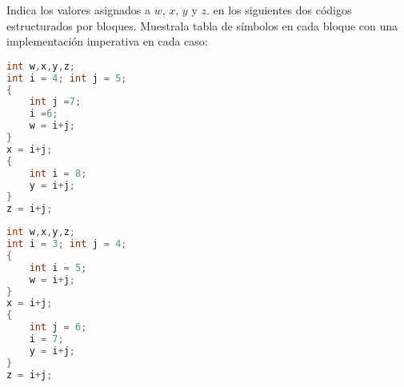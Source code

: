 \begin{Pro}
Indica los valores asignados a $w$, $x$, $y$ y $z$. en los siguientes dos códigos estructurados por bloques.
Muestrala tabla de símbolos en cada bloque con una implementación imperativa en cada caso:
\end{Pro}

\begin{multicols}{2}
\begin{lstlisting}[language=C++]
int w,x,y,z;
int i = 4; int j = 5;
{
    int j =7;
    i =6; 
    w = i+j;
}
x = i+j;
{
    int i = 8;
    y = i+j;
}
z = i+j;
\end{lstlisting}
\begin{lstlisting}[language=C++]
int w,x,y,z;
int i = 3; int j = 4;
{
    int i = 5;
    w = i+j;
}
x = i+j;
{
    int j = 6;
    i = 7;
    y = i+j;
}
z = i+j;
\end{lstlisting}

\end{multicols}
